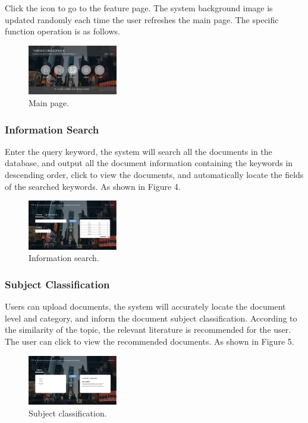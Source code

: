 Click the icon to go to the feature page. The system background image is updated randomly each time the user refreshes the main page.
The specific function operation is as follows.
\begin{figure}
	\includegraphics[width=0.35\textwidth]{figures/pic3.png}
	\caption{Main page.}
\end{figure}

\subsubsection{Information Search}
Enter the query keyword, the system will search all the documents in the database, and output all the document information containing the keywords in descending order, click to view the documents, and automatically locate the fields of the searched keywords. As shown in Figure 4.
\begin{figure}
	\includegraphics[width=0.35\textwidth]{figures/pic4.png}
	\caption{Information search.}
\end{figure}

\subsubsection{Subject Classification}
Users can upload documents, the system will accurately locate the document level and category, and inform the document subject classification. According to the similarity of the topic, the relevant literature is recommended for the user. The user can click to view the recommended documents. As shown in Figure 5.
\begin{figure}
	\includegraphics[width=0.35\textwidth]{figures/pic5.png}
	\caption{Subject classification.}
\end{figure}

